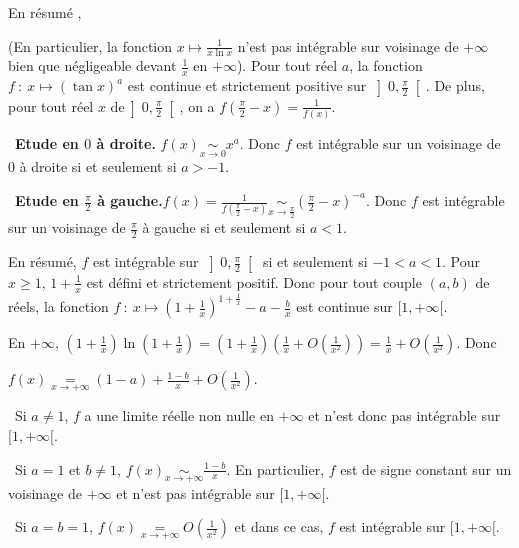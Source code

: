 {{En résumé , 

\begin{center}
\shadowbox{
la fonction $x\mapsto\frac{1}{x^a\ln^bx}$ est intégrable sur $[2,+\infty[$ si et seulement si $a > 1$ ou ($a=1$ et $b > 1$).
}
\end{center}

(En particulier, la fonction $x\mapsto\frac{1}{x\ln x}$ n'est pas intégrable sur voisinage de $+\infty$ bien que négligeable devant $\frac{1}{x}$ en $+\infty$).
Pour tout réel $a$,  la fonction $f~:~x\mapsto(\tan x)^a$ est continue et strictement positive sur $\left]0,\frac{\pi}{2}\right[$. De plus, pour tout réel $x$ de$\left]0,\frac{\pi}{2}\right[$, on a $f\left(\frac{\pi}{2}-x\right) =\frac{1}{f(x)}$.

\textbullet~\textbf{Etude en $0$ à droite.} $f(x)\underset{x\rightarrow0}{\sim}x^a$. Donc $f$ est intégrable sur un voisinage de $0$ à droite si et seulement si $a > -1$.

\textbullet~\textbf{Etude en $\frac{\pi}{2}$ à gauche.}$f(x)=\frac{1}{f\left(\frac{\pi}{2}-x\right)}\underset{x\rightarrow\frac{\pi}{2}}{\sim}\left(\frac{\pi}{2}-x\right)^{-a}$. Donc $f$ est intégrable sur un voisinage de $\frac{\pi}{2}$ à gauche si et seulement si $a < 1$. 

En résumé, $f$ est intégrable sur $\left]0,\frac{\pi}{2}\right[$ si et seulement si $-1 < a < 1$.
Pour $x\geqslant1$, $1+\frac{1}{x}$ est défini et strictement positif. Donc pour tout couple $(a,b)$ de réels, la fonction $f~:~ x\mapsto\left(1+\frac{1}{x}\right)^{1+\frac{1}{x}}-a -\frac{b}{x}$  est continue sur $[1,+\infty[$.

En $+\infty$, $\left(1+\frac{1}{x}\right)\ln\left(1+\frac{1}{x}\right) =\left(1+\frac{1}{x}\right)\left(\frac{1}{x}+O\left(\frac{1}{x^2}\right)\right)=\frac{1}{x}+O\left(\frac{1}{x^2}\right)$. Donc 

\begin{center}
$f(x)\underset{x\rightarrow+\infty}{=}(1-a)+\frac{1-b}{x}+O\left(\frac{1}{x^2}\right)$.
\end{center}

\textbullet~Si $a\neq 1$, $f$ a une limite réelle non nulle en $+\infty$ et n'est donc pas intégrable sur $[1,+\infty[$.

\textbullet~Si $a = 1$ et $b\neq 1$, $f(x)\underset{x\rightarrow+\infty}{\sim}\frac{1-b}{x}$. En particulier, $f$ est de signe constant sur un voisinage de $+\infty$ et n'est pas intégrable sur $[1,+\infty[$.

\textbullet~Si $a = b = 1$, $f(x)\underset{x\rightarrow+\infty}{=}O\left(\frac{1}{x^2}\right)$ et dans ce cas, $f$ est intégrable sur $[1,+\infty[$.

}}
